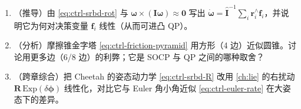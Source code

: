\begin{practice}
\begin{enumerate}
  \item （推导）由 \cref{eq:ctrl-srbd-rot} 与 $\boldsymbol{\omega}\times(\mathbf{I}\boldsymbol{\omega})\approx\mathbf{0}$ 写出 $\dot{\boldsymbol{\omega}}=\hat{\mathbf{I}}^{-1}\sum_i\mathbf{r}_i^\wedge\mathbf{f}_i$，并说明它为何对决策变量 $\mathbf{f}_i$ 线性（从而可进凸 QP）。
  \item （分析）摩擦锥金字塔 \cref{eq:ctrl-friction-pyramid} 用方形（4 边）近似圆锥。讨论用更多边（6/8 边）的利弊；它是 SOCP 与 QP 之间的哪种取舍？
  \item （跨章综合）把 Cheetah 的姿态动力学 \cref{eq:ctrl-srbd-R} 改用 \cref{ch:lie} 的右扰动 $\mathbf{R}\,\mathrm{Exp}(\delta\boldsymbol{\phi})$ 线性化，对比它与 Euler 角小角近似 \cref{eq:ctrl-euler-rate} 在大姿态下的差异。
\end{enumerate}
\end{practice}

